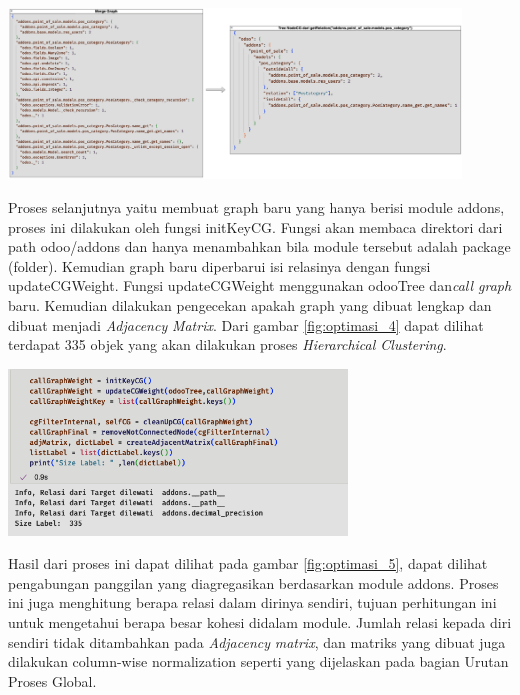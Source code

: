 \begin{center}
	\includegraphics[width=12cm]{img/bab_4/optimisasi_3.png}
	\label{fig:optimasi_3}
\end{center}

Proses selanjutnya yaitu membuat graph baru yang hanya berisi module addons, proses ini dilakukan oleh fungsi initKeyCG. Fungsi akan membaca direktori dari path odoo/addons dan hanya menambahkan bila module tersebut adalah package (folder). Kemudian graph baru diperbarui isi relasinya dengan fungsi updateCGWeight. Fungsi updateCGWeight menggunakan odooTree dan\textit{call graph} baru. Kemudian dilakukan pengecekan apakah graph yang dibuat lengkap dan dibuat menjadi \textit{Adjacency} \textit{Matrix}.  Dari gambar \ref{fig:optimasi_4} dapat dilihat terdapat 335 objek yang akan dilakukan proses \textit{Hierarchical Clustering}.

\begin{center}
	\includegraphics[width=9cm]{img/bab_4/optimisasi_4.png}
	\label{fig:optimasi_4}
\end{center}

Hasil dari proses ini dapat dilihat pada gambar \ref{fig:optimasi_5}, dapat dilihat pengabungan panggilan yang diagregasikan berdasarkan module addons. Proses ini juga menghitung berapa relasi dalam dirinya sendiri, tujuan perhitungan ini untuk mengetahui berapa besar kohesi didalam module. Jumlah relasi kepada diri sendiri tidak ditambahkan pada \textit{Adjacency} \textit{matrix}, dan matriks yang dibuat juga dilakukan column-wise normalization seperti yang dijelaskan pada bagian Urutan Proses Global.  


